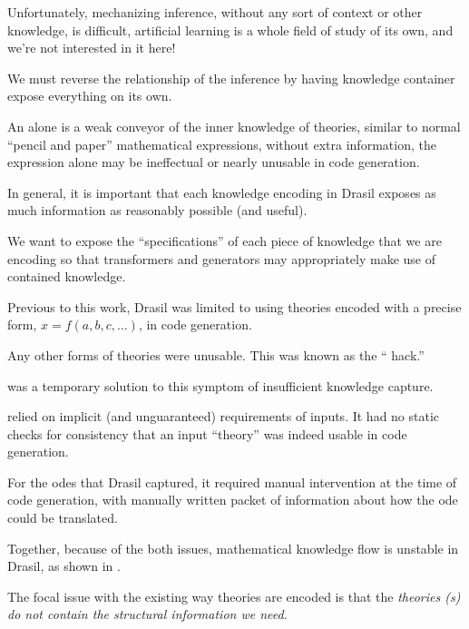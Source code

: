 Unfortunately, mechanizing inference, without any sort of context or other
knowledge, is difficult, artificial learning is a whole field of study of its
own, and we're not interested in it here!

We must reverse the relationship of the inference by having knowledge container
expose everything on its own.




An \Expr{} alone is a weak conveyor of the inner knowledge of theories, similar
to normal ``pencil and paper'' mathematical expressions, without extra
information, the expression alone may be ineffectual or nearly unusable in code
generation.




In general, it is important that each knowledge encoding in Drasil exposes as
much information as reasonably possible (and useful).

We want to expose the ``specifications'' of each piece of knowledge that we are
encoding so that transformers and generators may appropriately make use of
contained knowledge.

Previous to this work, Drasil was limited to using theories encoded with a
precise form, \(x = f(a, b, c, \ldots{})\), in code generation.

Any other forms of theories were unusable. This was known as the ``\relToQD{}
hack.''




\originalRelToQDHaskell{}

 was a temporary solution to this symptom of
insufficient knowledge capture.

\relToQD{} relied on implicit (and unguaranteed) requirements of inputs. It had
no static checks for consistency that an input ``theory'' was indeed usable in
code generation.




For the \acsp{ode} that Drasil captured, it required manual intervention at the
time of code generation, with manually written packet of information about how
the \acs{ode} could be translated.




Together, because of the both issues, mathematical knowledge flow is unstable in
Drasil, as shown in .

The focal issue with the existing way theories are encoded is that the
\textit{theories (\RelationConcept{}s) do not contain the structural information
we need}.

